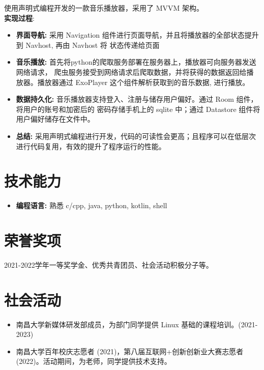 \documentclass{resume}
\begin{document}
  使用声明式编程开发的一款音乐播放器，采用了 MVVM 架构。 
 \\   \textbf{实现过程}:  
\begin{itemize}
  \item \textbf{界面导航: } 采用 Navigation 组件进行页面导航，并且将播放器的全部状态提升到 Navhost, 再由 Navhost 将
  状态传递给页面
  \item \textbf{音乐播放: } 首先将python的爬取服务部署在服务器上，播放器可向服务器发送网络请求，
    爬虫服务接受到网络请求后爬取数据，并将获得的数据返回给播放器。播放器通过 ExoPlayer 这个组件解析获取到的音乐数据,
    进行播放。
  \item \textbf{数据持久化: } 音乐播放器支持登入、注册与储存用户偏好。通过 Room 组件，将用户的账号和加密后的
  密码存储手机上的 sqlite 中；通过 Datastore 组件将用户偏好储存在文件中。
  \item \textbf{总结: } 采用声明式编程进行开发，代码的可读性会更高；且程序可以在低层次进行代码复用，有效的提升了程序运行的性能。
\end{itemize}

\section{技术能力}
\begin{itemize}
  \item \textbf{编程语言: } 熟悉 c/cpp, java, python, kotlin, shell
\end{itemize}

\section{荣誉奖项}
2021-2022学年一等奖学金、优秀共青团员、社会活动积极分子等。

\section{社会活动}
\begin{itemize}[parsep=0.2ex]
  \item 南昌大学新媒体研发部成员，为部门同学提供 Linux 基础的课程培训。(2021-2023)
  \item 南昌大学百年校庆志愿者 (2021)，第八届互联网+创新创新业大赛志愿者(2022)。活动期间，为老师，同学提供技术支持。
\end{itemize}
\end{document}
